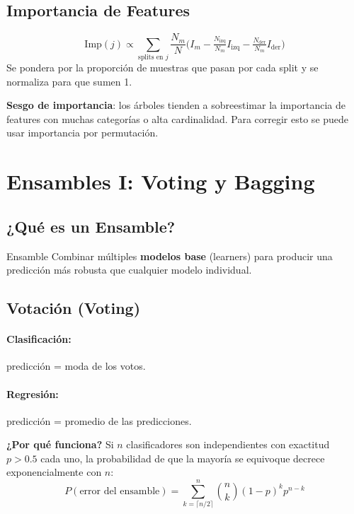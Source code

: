 \documentclass[12pt, a4paper]{article}
\begin{document}
\subsection{Importancia de Features}

\[
  \text{Imp}(j) \propto \sum_{\text{splits en }j}
  \frac{N_m}{N}\bigl(I_m - \tfrac{N_{\text{izq}}}{N_m}I_{\text{izq}}
  - \tfrac{N_{\text{der}}}{N_m}I_{\text{der}}\bigr)
\]
Se pondera por la proporción de muestras que pasan por cada split y se normaliza para que
sumen 1.

\begin{notebox}
  \textbf{Sesgo de importancia}: los árboles tienden a sobreestimar la importancia de
  features con muchas categorías o alta cardinalidad. Para corregir esto se puede usar
  importancia por permutación.
\end{notebox}

\section{Ensambles I: Voting y Bagging}

\subsection{¿Qué es un Ensamble?}

\begin{defbox}{Ensamble}
  Combinar múltiples \textbf{modelos base} (learners) para producir una predicción
  más robusta que cualquier modelo individual.
\end{defbox}

\subsection{Votación (Voting)}

\paragraph{Clasificación:} predicción = moda de los votos.
\paragraph{Regresión:} predicción = promedio de las predicciones.

\textbf{¿Por qué funciona?}
Si $n$ clasificadores son independientes con exactitud $p > 0.5$ cada uno, la probabilidad
de que la mayoría se equivoque decrece exponencialmente con $n$:
\[
  P(\text{error del ensamble}) = \sum_{k=\lceil n/2\rceil}^{n}\binom{n}{k}(1-p)^k p^{n-k}
\]
\end{document}
